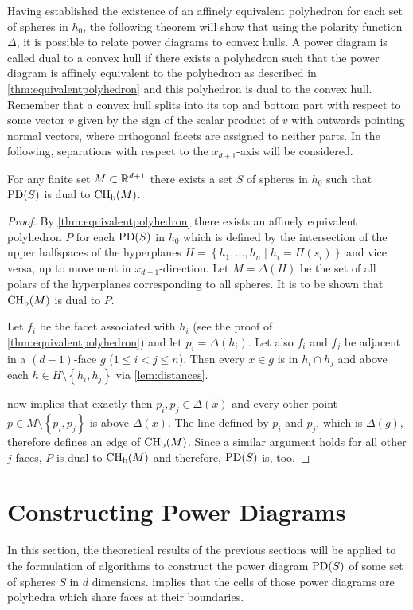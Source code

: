 Having established the existence of an affinely equivalent polyhedron for each set of spheres in $h_0$, the following theorem will show that using the polarity function $\Delta$, it is possible to relate power diagrams to convex hulls.
A power diagram is called dual to a convex hull if there exists a polyhedron such that the power diagram is affinely equivalent to the polyhedron as described in \cref{thm:equivalentpolyhedron} and this polyhedron is dual to the convex hull.
Remember that a convex hull splits into its top and bottom part with respect to some vector $v$ given by the sign of the scalar product of $v$ with outwards pointing normal vectors, where orthogonal facets are assigned to neither parts.
In the following, separations with respect to the $x_{d+1}$-axis will be considered.
\begin{theorem}
    \label{thm:equivalentconvexhull}
    For any finite set $M \subset \mathbb{R}^{d+1}$ there exists a set $S$ of spheres in $h_0$ such that $\operatorname{PD}(S)$ is dual to $\operatorname{CH_b}(M)$.
\end{theorem}
\begin{proof}
    By \cref{thm:equivalentpolyhedron} there exists an affinely equivalent polyhedron $P$ for each $\operatorname{PD}(S)$ in $h_0$ which is defined by the intersection of the upper halfspaces of the hyperplanes $H = \left\{ h_1, \dots, h_n \mid h_i = \Pi(s_i) \right\}$ and vice versa, up to movement in $x_{d+1}$-direction.
    Let $M = \Delta(H)$ be the set of all polars of the hyperplanes corresponding to all spheres.
    It is to be shown that $\operatorname{CH_b}(M)$ is dual to $P$.

    Let $f_i$ be the facet associated with $h_i$ (see the proof of \cref{thm:equivalentpolyhedron}) and let $p_i = \Delta(h_i)$.
    Let also $f_i$ and $f_j$ be adjacent in a $(d-1)$-face $g$ ($1 \leq i < j \leq n$).
    Then every $x \in g$ is in $h_i \cap h_j$ and above each $h \in H \setminus \left\{ h_i, h_j \right\}$ via \cref{lem:distances}.

     now implies that exactly then $p_i, p_j \in \Delta(x)$ and every other point $p \in M \setminus \left\{ p_i, p_j \right\}$ is above $\Delta(x)$.
    The line defined by $p_i$ and $p_j$, which is $\Delta(g)$, therefore defines an edge of $\operatorname{CH_b}(M)$.
    Since a similar argument holds for all other $j$-faces, $P$ is dual to $\operatorname{CH_b}(M)$ and therefore, $\operatorname{PD}(S)$ is, too.
\end{proof}

\section{Constructing Power Diagrams}
\label{sec:constructing_power_diagrams}
In this section, the theoretical results of the previous sections will be applied to the formulation of algorithms to construct the power diagram $\operatorname{PD}(S)$ of some set of spheres $S$ in $d$ dimensions.
 implies that the cells of those power diagrams are polyhedra which share faces at their boundaries.

